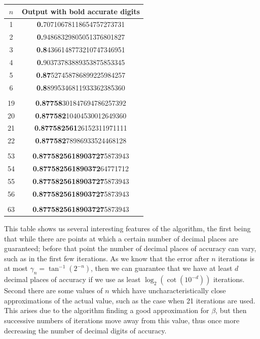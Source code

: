 {{\selectfont
\begin{center}
\begin{tabular}{|c|c|}
	\hline
	\(n\) & \textsf{Output with bold accurate digits}\\\hline
	1 & \textbf{0.}70710678118654757273731\\\hline
	2 & \textbf{0.}94868329805051376801827\\\hline
	3 & \textbf{0.8}4366148773210747346951\\\hline
	4 & \textbf{0.}90373783889353875853345\\\hline
	5 & \textbf{0.87}527458786899225984257\\\hline
	6 & \textbf{0.8}8995346811933362385360\\\hline
	\cdots & \cdots\\\hline
	19 & \textbf{0.87758}301847694786257392\\\hline
	20 & \textbf{0.877582}10404530012649360\\\hline
	21 & \textbf{0.877582561}26152311971111\\\hline
	22 & \textbf{0.877582}78986933524468128\\\hline
	\cdots & \cdots\\\hline
	53 & \textbf{0.8775825618903727}5873943\\\hline
	54 & \textbf{0.877582561890372}64771712\\\hline
	55 & \textbf{0.8775825618903727}5873943\\\hline
	56 & \textbf{0.8775825618903727}5873943\\\hline
	\cdots & \cdots\\\hline
	63 & \textbf{0.8775825618903727}5873943\\\hline
\end{tabular}
\end{center}}

This table shows us several interesting features of the algorithm, the first being that while there are points at which a certain number of decimal places are guaranteed; before that point the number of decimal places of accuracy can vary, such as in the first few iterations. As we know that the error after \(n\) iterations is at most \(\gamma_n = \tan^{-1}(2^{-n})\), then we can guarantee that we have at least \(d\) decimal places of accuracy if we use as least \(\log_2(\cot(10^{-d}))\) iterations.\\

Second there are some values of \(n\) which have uncharacteristically close approximations of the actual value, such as the case when 21 iterations are used. This arises due to the algorithm finding a good approximation for \(\beta\), but then successive numbers of iterations move away from this value, thus once more decreasing the number of decimal digits of accuracy.\\

}
